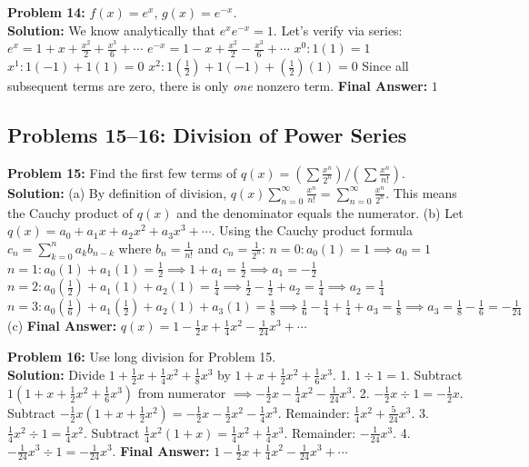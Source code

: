 \documentclass[11pt, letterpaper]{article}
\theoremstyle{definition}
\theoremstyle{remark}
\begin{document}
\textbf{Problem 14:} $f(x) = e^x$, $g(x) = e^{-x}$.
\\[6pt]
\textbf{Solution:} We know analytically that $e^x e^{-x} = 1$. Let's verify via series:
$e^x = 1 + x + \frac{x^2}{2} + \frac{x^3}{6} + \cdots$
$e^{-x} = 1 - x + \frac{x^2}{2} - \frac{x^3}{6} + \cdots$
$x^0: 1(1) = 1$
$x^1: 1(-1) + 1(1) = 0$
$x^2: 1(\frac{1}{2}) + 1(-1) + (\frac{1}{2})(1) = 0$
Since all subsequent terms are zero, there is only \textit{one} nonzero term.
\textbf{Final Answer:} $1$

\subsection{Problems 15--16: Division of Power Series}
\textbf{Problem 15:} Find the first few terms of $q(x) = \left(\sum \frac{x^n}{2^n}\right) / \left(\sum \frac{x^n}{n!}\right)$.
\\[6pt]
\textbf{Solution:}
(a) By definition of division, $q(x) \sum_{n=0}^{\infty} \frac{x^n}{n!} = \sum_{n=0}^{\infty} \frac{x^n}{2^n}$. This means the Cauchy product of $q(x)$ and the denominator equals the numerator.
(b) Let $q(x) = a_0 + a_1 x + a_2 x^2 + a_3 x^3 + \cdots$.
Using the Cauchy product formula $c_n = \sum_{k=0}^n a_k b_{n-k}$ where $b_n = \frac{1}{n!}$ and $c_n = \frac{1}{2^n}$:
$n=0: a_0(1) = 1 \implies a_0 = 1$
$n=1: a_0(1) + a_1(1) = \frac{1}{2} \implies 1 + a_1 = \frac{1}{2} \implies a_1 = -\frac{1}{2}$
$n=2: a_0(\frac{1}{2}) + a_1(1) + a_2(1) = \frac{1}{4} \implies \frac{1}{2} - \frac{1}{2} + a_2 = \frac{1}{4} \implies a_2 = \frac{1}{4}$
$n=3: a_0(\frac{1}{6}) + a_1(\frac{1}{2}) + a_2(1) + a_3(1) = \frac{1}{8} \implies \frac{1}{6} - \frac{1}{4} + \frac{1}{4} + a_3 = \frac{1}{8} \implies a_3 = \frac{1}{8} - \frac{1}{6} = -\frac{1}{24}$
(c) \textbf{Final Answer:} $q(x) = 1 - \frac{1}{2}x + \frac{1}{4}x^2 - \frac{1}{24}x^3 + \cdots$

\textbf{Problem 16:} Use long division for Problem 15.
\\[6pt]
\textbf{Solution:}
Divide $1 + \frac{1}{2}x + \frac{1}{4}x^2 + \frac{1}{8}x^3$ by $1 + x + \frac{1}{2}x^2 + \frac{1}{6}x^3$.
1. $1 \div 1 = 1$. Subtract $1(1 + x + \frac{1}{2}x^2 + \frac{1}{6}x^3)$ from numerator $\implies -\frac{1}{2}x - \frac{1}{4}x^2 - \frac{1}{24}x^3$.
2. $-\frac{1}{2}x \div 1 = -\frac{1}{2}x$. Subtract $-\frac{1}{2}x(1 + x + \frac{1}{2}x^2) = -\frac{1}{2}x - \frac{1}{2}x^2 - \frac{1}{4}x^3$. Remainder: $\frac{1}{4}x^2 + \frac{5}{24}x^3$.
3. $\frac{1}{4}x^2 \div 1 = \frac{1}{4}x^2$. Subtract $\frac{1}{4}x^2(1 + x) = \frac{1}{4}x^2 + \frac{1}{4}x^3$. Remainder: $-\frac{1}{24}x^3$.
4. $-\frac{1}{24}x^3 \div 1 = -\frac{1}{24}x^3$.
\textbf{Final Answer:} $1 - \frac{1}{2}x + \frac{1}{4}x^2 - \frac{1}{24}x^3 + \cdots$
\end{document}
